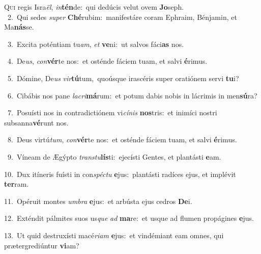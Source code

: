 \lettrine{\initial\textcolor{\initialcolor}{Q}}{ui} regis Isra\-\textit{ël}\-, \textit{in}\-\textbf{tén}de:~\star qui dedúcis velut ovem \textbf{Jo}\-seph.\\
{\numbfont\textcolor{\numbcolor}{~2.}}~Qui sedes \textit{su}\-\textit{per} \textbf{Ché}\-rubim:~\star manifestáre coram Ephraim, Bénjamin, et Ma\-\textbf{nás}\-se.\par
{\numbfont\textcolor{\numbcolor}{~3.}}~Excita poténtiam tu\-\textit{am}\-, \textit{et} \textbf{ve}\-ni:~\star ut salvos fáci\textbf{as} nos.\par
{\numbfont\textcolor{\numbcolor}{~4.}}~De\-\textit{us}\-, \textit{con}\-\textbf{vér}te nos:~\star et osténde fáciem tuam, et salvi \textbf{é}\-rimus.\par
{\numbfont\textcolor{\numbcolor}{~5.}}~Dómine, De\textit{us} \textit{vir}\-\textbf{tú}tum,~\star quoúsque irascéris super oratiónem servi \textbf{tu}\-i?\par
{\numbfont\textcolor{\numbcolor}{~6.}}~Cibábis nos pane \textit{la}\-\textit{cri}\textbf{má}rum:~\star et potum dabis nobis in lácrimis in men\-\textbf{sú}\-ra?\par
{\numbfont\textcolor{\numbcolor}{~7.}}~Posuísti nos in contradictiónem vi\-\textit{cí}\-\textit{nis} \textbf{nos}\-tris:~\star et inimíci nostri subsanna\-\textbf{vé}\-runt nos.\par
{\numbfont\textcolor{\numbcolor}{~8.}}~Deus virtú\-\textit{tum}\-, \textit{con}\-\textbf{vér}te nos:~\star et osténde fáciem tuam, et salvi \textbf{é}\-rimus.\par
{\numbfont\textcolor{\numbcolor}{~9.}}~Víneam de Ægýpto \textit{trans}\-\textit{tu}\textbf{lís}ti:~\star ejecísti Gentes, et plantásti \textbf{e}\-am.\par
{\numbfont\textcolor{\numbcolor}{10.}}~Dux itíneris fuísti in con\-\textit{spéc}\-\textit{tu} \textbf{e}\-jus:~\star plantásti radíces ejus, et implévit \textbf{ter}\-ram.\par
{\numbfont\textcolor{\numbcolor}{11.}}~Opéruit montes \textit{um}\-\textit{bra} \textbf{e}\-jus:~\star et arbústa ejus cedros \textbf{De}\-i.\par
{\numbfont\textcolor{\numbcolor}{12.}}~Exténdit pálmites suos us\textit{que} \textit{ad} \textbf{ma}\-re:~\star et usque ad flumen propágines \textbf{e}\-jus.\par
{\numbfont\textcolor{\numbcolor}{13.}}~Ut quid destruxísti macé\-\textit{ri}\-\textit{am} \textbf{e}\-jus:~\star et vindémiant eam omnes, qui prætergrediúntur \textbf{vi}\-am?\par
